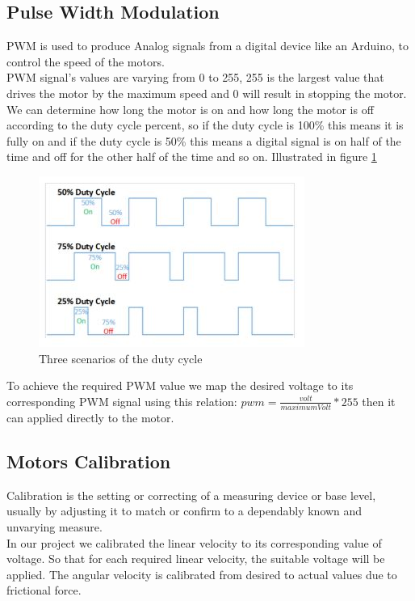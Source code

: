 \subsection{Pulse Width Modulation}
\hspace{2cm}PWM is used to produce Analog signals from a digital device like an Arduino, to control the speed of the motors.\\
PWM signal’s values are varying from  0 to 255, 255 is the largest value that drives the motor by the maximum speed and 0 will result in stopping the motor. 
We can determine how long the motor is on and how long the motor is off according to the duty cycle percent, so if the duty cycle is 100\% this means it is fully on and if the duty cycle is 50\% this means a digital signal is on half of the time and off for the other half of the time and so on. Illustrated in figure \ref{fig:pwm} 
  \begin{figure}[H]%
    \center%
    \includegraphics[width=.8\textwidth]{images/Alzahraa/duty_cycle.JPG}%
    \caption[Pulse Width Modulation]{Three scenarios of the duty cycle}\label{fig:pwm}%
  \end{figure} 
To achieve the required PWM value we map the desired voltage to its corresponding PWM signal using this relation:  \(pwm =  \frac{volt}{maximumVolt} * 255 \) then it can applied directly to the motor.

\subsection{Motors Calibration}
\hspace{2cm}Calibration is the setting or correcting of a measuring device or base level, usually by adjusting it to match or confirm to a dependably known and unvarying measure.\cite{web004}\\
In our project we calibrated the linear velocity to its corresponding value of voltage. So that for each required linear velocity, the suitable voltage will be applied. The angular velocity is calibrated from desired to actual values due to frictional force.\\
